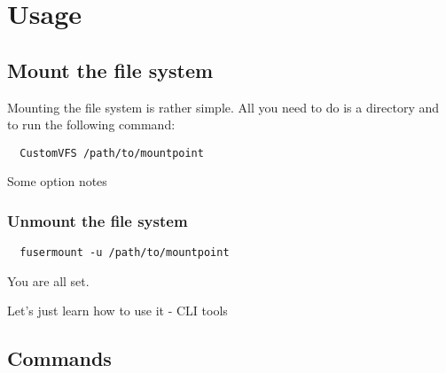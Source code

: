 \chapter{Usage}

\section*{Mount the file system}

Mounting the file system is rather simple.
All you need to do is a directory and to run the following command:

\begin{Verbatim}
  CustomVFS /path/to/mountpoint
\end{Verbatim}

Some option notes

\subsection*{Unmount the file system}

\begin{Verbatim}
  fusermount -u /path/to/mountpoint
\end{Verbatim}

You are all set.

Let's just learn how to use it - CLI tools

\section*{Commands}
